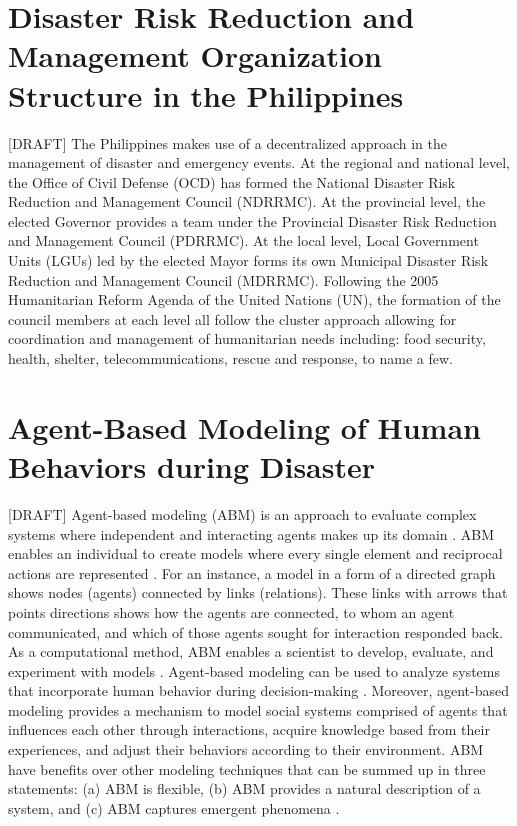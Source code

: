 \documentclass[runningheads]{llncs}
\begin{document}
\section{Disaster Risk Reduction and Management Organization Structure in the Philippines}
[DRAFT]
The Philippines makes use of a decentralized approach in the management of disaster and emergency events. At the regional and national level, the Office of Civil Defense (OCD) has formed the National Disaster Risk Reduction and Management Council (NDRRMC). At the provincial level, the elected Governor provides a team under the Provincial Disaster Risk Reduction and Management Council (PDRRMC). At the local level, Local Government Units (LGUs) led by the elected Mayor forms its own Municipal Disaster Risk Reduction and Management Council (MDRRMC). Following the 2005 Humanitarian Reform Agenda of the United Nations (UN), the formation of the council members at each level all follow the cluster approach allowing for coordination and management of humanitarian needs including: food security, health, shelter, telecommunications, rescue and response, to name a few.

\section{Agent-Based Modeling of Human Behaviors during Disaster}
[DRAFT] Agent-based modeling (ABM) is an approach to evaluate complex systems where independent and interacting agents makes up its domain \cite{macal2005tutorial}. ABM enables an individual to create models where every single element and reciprocal actions are represented \cite{gilbert2008agent}. For an instance, a model in a form of a directed graph shows nodes (agents) connected by links (relations). These links with arrows that points directions shows how the agents are connected, to whom an agent communicated, and which of those agents sought for interaction responded back. As a computational method, ABM enables a scientist to develop, evaluate, and experiment with models \cite{gilbert2008agent}. Agent-based modeling can be used to analyze systems that incorporate human behavior during decision-making \cite{macal2005tutorial}. Moreover, agent-based modeling provides a mechanism to model social systems comprised of agents that influences each other through interactions, acquire knowledge based from their experiences, and adjust their behaviors according to their environment. ABM have benefits over other modeling techniques that can be summed up in three statements: (a) ABM is flexible, (b) ABM provides a natural description of a system, and (c) ABM captures emergent phenomena \cite{bonabeau2002agent}.
\end{document}
